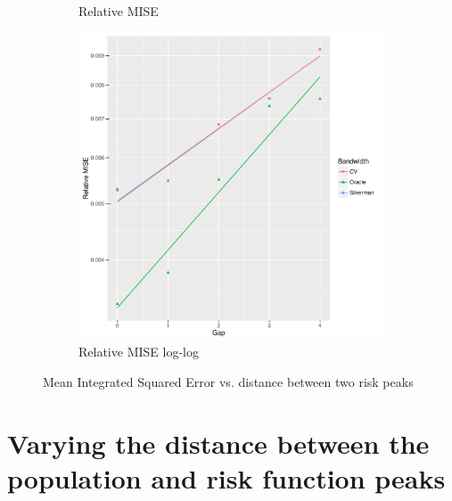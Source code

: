 \begin{figure}[htbp]
\begin{subfigure}[b]{0.3\textwidth}
    \caption{Relative MISE}
    \end{subfigure}
    \begin{subfigure}[b]{0.3\textwidth}
    \includegraphics[width=\textwidth]{results/by_two_peaks/RMISE-vs-risk-peak-gap-log-log}
    \caption{Relative MISE log-log}
    \end{subfigure}
    \caption[MISE: by risk decay]{Mean Integrated Squared Error vs. distance between two risk peaks}
    \label{fig:ise:p1.4_100_G}
\end{figure}

\section{Varying the distance between the population and risk function peaks}

